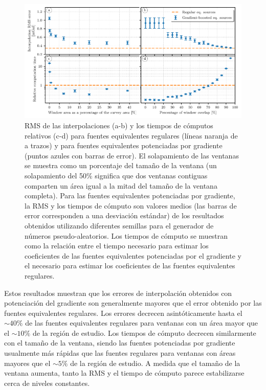 \begin{figure}[tb]
    \includegraphics[width=\linewidth]{figs/eql-gradient-boosted/gradient-boosted-comparisons.pdf}
    \caption{
        \acs{RMS} de las interpolaciones (a-b) y los tiempos de cómputos
        relativos (c-d) para fuentes equivalentes regulares (líneas naranja de
        a trazos) y para fuentes equivalentes potenciadas por gradiente
        (puntos azules con barras de error).
        El solapamiento de las ventanas se muestra como un porcentaje del
        tamaño de la ventana (un solapamiento del 50\% significa que dos
        ventanas contiguas comparten un área igual a la mitad del tamaño de la
        ventana completa).
        Para las fuentes equivalentes potenciadas por gradiente, la
        \acs{RMS} y los tiempos de cómputo son valores medios (las barras de
        error corresponden a una desviación estándar) de los resultados
        obtenidos utilizando diferentes semillas para el generador de números
        pseudo-aleatorios.
        Los tiempos de cómputo se muestran como la relación entre el tiempo
        necesario para estimar los coeficientes de las fuentes equivalentes
        potenciadas por el gradiente y el necesario para estimar los
        coeficientes de las fuentes equivalentes regulares.
    }
    \label{fig:gradient-boosted-comparison}
\end{figure}

Estos resultados muestran que los errores de interpolación obtenidos con
potenciación del gradiente son generalmente mayores que el error obtenido por
las fuentes equivalentes regulares.
Los errores decrecen asintóticamente hasta el $\sim 40\%$ de las fuentes
equivalentes regulares para ventanas con un área mayor que el $\sim 10\%$
de la región de estudio.
Los tiempos de cómputo decrecen similarmente con el tamaño de la ventana,
siendo las fuentes potenciadas por gradiente usualmente más rápidas que las
fuentes regulares para ventanas con áreas mayores que el $\sim 5\%$ de la
región de estudio.
A medida que el tamaño de la ventana aumenta, tanto la \ac{RMS} y el tiempo de
cómputo parece estabilizarse cerca de niveles constantes.

